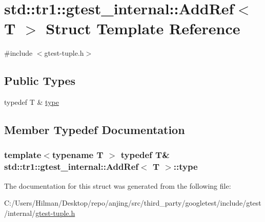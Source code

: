\hypertarget{structstd_1_1tr1_1_1gtest__internal_1_1_add_ref}{}\section{std\+:\+:tr1\+:\+:gtest\+\_\+internal\+:\+:Add\+Ref$<$ T $>$ Struct Template Reference}
\label{structstd_1_1tr1_1_1gtest__internal_1_1_add_ref}


{\ttfamily \#include $<$gtest-\/tuple.\+h$>$}

\subsection*{Public Types}
\begin{DoxyCompactItemize}
\item 
typedef T \& \hyperlink{structstd_1_1tr1_1_1gtest__internal_1_1_add_ref_a1e5616e414125574c1653e3a1fc68491}{type}
\end{DoxyCompactItemize}


\subsection{Member Typedef Documentation}
\hypertarget{structstd_1_1tr1_1_1gtest__internal_1_1_add_ref_a1e5616e414125574c1653e3a1fc68491}{}
\subsubsection[{type}]{\setlength{\rightskip}{0pt plus 5cm}template$<$typename T $>$ typedef T\& {\bf std\+::tr1\+::gtest\+\_\+internal\+::\+Add\+Ref}$<$ T $>$\+::{\bf type}}\label{structstd_1_1tr1_1_1gtest__internal_1_1_add_ref_a1e5616e414125574c1653e3a1fc68491}


The documentation for this struct was generated from the following file\+:\begin{DoxyCompactItemize}
\item 
C\+:/\+Users/\+Hilman/\+Desktop/repo/anjing/src/third\+\_\+party/googletest/include/gtest/internal/\hyperlink{gtest-tuple_8h}{gtest-\/tuple.\+h}\end{DoxyCompactItemize}
